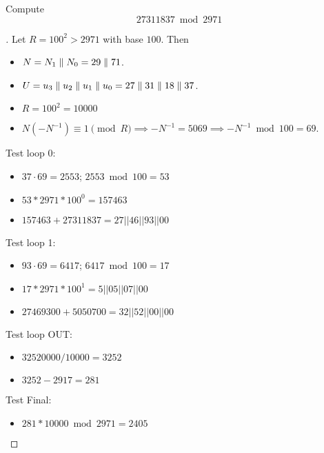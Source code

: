 \begin{example}
Compute \[
27311837\bmod 2971
\]
\begin{proof}[\sol]
Let $R=100^2>2971$ with base $100$. Then \begin{itemize}
\item $N=N_1\parallel N_0 = 29\parallel71$.
\item $U=u_3\parallel u_2\parallel u_1\parallel u_0=27\parallel 31\parallel 18\parallel 37$.
\item $R=100^2=10000$
\item $N(-N^{-1})\equiv 1\pmod{R}\implies -N^{-1}=5069\implies -N^{-1} \bmod 100 = 69$.
\end{itemize}
Test loop 0:
\begin{itemize}
	\item $37\cdot 69=2553$; $2553\bmod 100 = 53$
	\item $53*2971*100^0=157463$
	\item $157463+27311837=27|| 46|| 93|| 00$
\end{itemize}
Test loop 1:
\begin{itemize}
	\item $93\cdot 69=6417$; $6417\bmod 100 = 17$
	\item $17*2971*100^1=5||05||07||00$
	\item $27469300+5050700=32||52||00||00$
\end{itemize}
Test loop OUT:\begin{itemize}
	\item $32520000 / 10000 = 3252$
	\item $3252 - 2917 = 281$
\end{itemize}
Test Final:\begin{itemize}
	\item $281*10000\bmod 2971 = 2405$
\end{itemize}
\end{proof}
\end{example}

